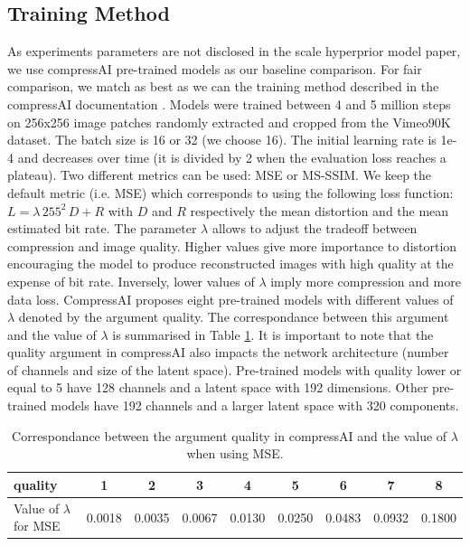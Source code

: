 \documentclass{article}
\begin{document}
\subsection{Training Method}
\label{training_method}
As experiments parameters are not disclosed in the scale hyperprior model paper, we use compressAI pre-trained models as our baseline comparison. For fair comparison, we match as best as we can the training method described in the compressAI documentation \cite{compressai_train}. Models were trained between 4 and 5 million steps on 256x256 image patches randomly extracted and cropped from the Vimeo90K dataset. The batch size is 16 or 32 (we choose 16). The initial learning rate is 1e-4 and decreases over time (it is divided by 2 when the evaluation loss reaches a plateau). Two different metrics can be used: MSE or MS-SSIM. We keep the default metric (i.e. MSE) which corresponds to using the following loss function: \(L = \lambda\, 255^{2}\, D + R\) with \(D\) and \(R\) respectively the mean distortion and the mean estimated bit rate. The parameter \(\lambda\) allows to adjust the tradeoff between compression and image quality. Higher values give more importance to distortion encouraging the model to produce reconstructed images with high quality at the expense of bit rate. Inversely, lower values of \(\lambda\) imply more compression and more data loss. CompressAI proposes eight pre-trained models with different values of \(\lambda\) denoted by the argument \textsf{quality}. The correspondance between this argument and the value of \(\lambda\) is summarised in Table \ref{tab_quality_lambda}. It is important to note that the \textsf{quality} argument in compressAI also impacts the network architecture (number of channels and size of the latent space). Pre-trained models with \textsf{quality} lower or equal to 5 have 128 channels and a latent space with 192 dimensions. Other pre-trained models have 192 channels and a larger latent space with 320 components. 

\begin{table}[]
    \centering
    \caption{Correspondance between the argument \textsf{quality} in compressAI and the value of \(\lambda\) when using MSE.}
    \label{tab_quality_lambda}
    \begin{tabular}{|l|c|c|c|c|c|c|c|c|}
    \hline
    \textsf{quality}             & 1 & 2 & 3 & 4 & 5 & 6 & 7 & 8 \\ \hline
    Value of \(\lambda\) for MSE & 0.0018 & 0.0035 & 0.0067 & 0.0130 & 0.0250 & 0.0483 & 0.0932 & 0.1800 \\ \hline
    \end{tabular}
\end{table}
\end{document}
